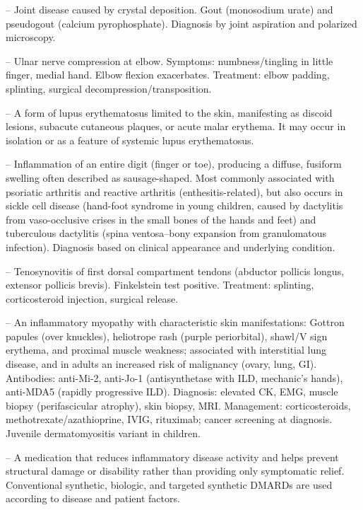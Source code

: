 -- Joint disease caused by crystal deposition. Gout (monosodium urate) and pseudogout (calcium pyrophosphate). Diagnosis by joint aspiration and polarized microscopy.

-- Ulnar nerve compression at elbow. Symptoms: numbness/tingling in little finger, medial hand. Elbow flexion exacerbates. Treatment: elbow padding, splinting, surgical decompression/transposition.

-- A form of lupus erythematosus limited to the skin, manifesting as discoid lesions, subacute cutaneous plaques, or acute malar erythema. It may occur in isolation or as a feature of systemic lupus erythematosus.

-- Inflammation of an entire digit (finger or toe), producing a diffuse, fusiform swelling often described as sausage-shaped. Most commonly associated with psoriatic arthritis and reactive arthritis (enthesitis-related), but also occurs in sickle cell disease (hand-foot syndrome in young children, caused by dactylitis from vaso-occlusive crises in the small bones of the hands and feet) and tuberculous dactylitis (spina ventosa--bony expansion from granulomatous infection). Diagnosis based on clinical appearance and underlying condition.

-- Tenosynovitis of first dorsal compartment tendons (abductor pollicis longus, extensor pollicis brevis). Finkelstein test positive. Treatment: splinting, corticosteroid injection, surgical release.

-- An inflammatory myopathy with characteristic skin manifestations: Gottron papules (over knuckles), heliotrope rash (purple periorbital), shawl/V sign erythema, and proximal muscle weakness; associated with interstitial lung disease, and in adults an increased risk of malignancy (ovary, lung, GI). Antibodies: anti-Mi-2, anti-Jo-1 (antisynthetase with ILD, mechanic's hands), anti-MDA5 (rapidly progressive ILD). Diagnosis: elevated CK, EMG, muscle biopsy (perifascicular atrophy), skin biopsy, MRI. Management: corticosteroids, methotrexate/azathioprine, IVIG, rituximab; cancer screening at diagnosis. Juvenile dermatomyositis variant in children.

-- A medication that reduces inflammatory disease activity and helps prevent structural damage or disability rather than providing only symptomatic relief. Conventional synthetic, biologic, and targeted synthetic DMARDs are used according to disease and patient factors.

